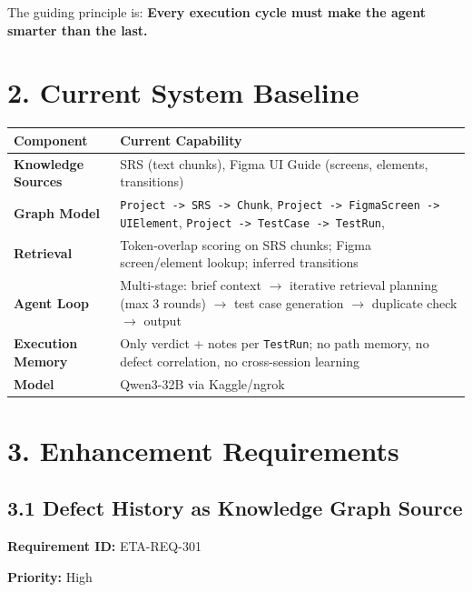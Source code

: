 The guiding principle is: \textbf{Every execution cycle must make the agent smarter than the last.}

\section*{2. Current System Baseline}

\begingroup\footnotesize\setlength{\tabcolsep}{4pt}
\begin{tabularx}{\textwidth}{@{}YY@{}}
\toprule
\textbf{Component} & \textbf{Current Capability} \\
\midrule
\textbf{Knowledge Sources} & SRS (text chunks), Figma UI Guide (screens, elements, transitions) \\
\textbf{Graph Model} & \texttt{Project -> SRS -> Chunk}, \texttt{Project -> FigmaScreen -> UIElement}, \texttt{Project -> TestCase -> TestRun},  \\
\textbf{Retrieval} & Token-overlap scoring on SRS chunks; Figma screen/element lookup; inferred  transitions \\
\textbf{Agent Loop} & Multi-stage: brief context $\rightarrow$ iterative retrieval planning (max 3 rounds) $\rightarrow$ test case generation $\rightarrow$ duplicate check $\rightarrow$ output \\
\textbf{Execution Memory} & Only verdict + notes per \texttt{TestRun}; no path memory, no defect correlation, no cross-session learning \\
\textbf{Model} & Qwen3-32B via Kaggle/ngrok \\
\bottomrule\end{tabularx}\endgroup

\section*{3. Enhancement Requirements}

\subsection*{3.1 Defect History as Knowledge Graph Source}

\textbf{Requirement ID:} ETA-REQ-301

\textbf{Priority:} High

